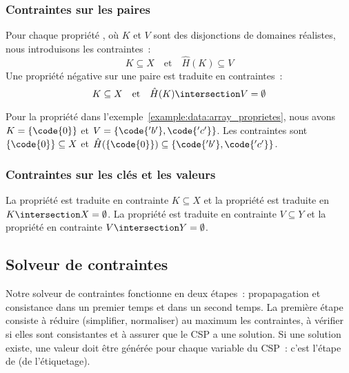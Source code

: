 \subsubsection{Contraintes sur les paires}

Pour chaque propriété , où $K$ et $V$ sont des disjonctions de
domaines réalistes, nous introduisons les contraintes~:
%
$$K \subseteq X \quad\mathrm{et}\quad \hat{H}(K) \subseteq V$$
%
Une propriété négative sur une paire  est traduite en
contraintes~:
%
$$K \subseteq X \quad\mathrm{et}\quad \hat{H}(K) \intersection V = \emptyset$$

Pour la propriété  dans
l'exemple~\ref{example:data:array_proprietes}, nous avons $K = \{\code{0}\}$ et
$V = \{\code{'b'}, \code{'c'}\}$. Les contraintes sont $\{\code{0}\} \subseteq
X$ et $\hat{H}(\{\code{0}\}) \subseteq \{\code{'b'}, \code{'c'}\}$.

\subsubsection{Contraintes sur les clés et les valeurs}

La propriété  est traduite en contrainte $K \subseteq X$ et la
propriété  est traduite en $K \intersection X = \emptyset$. La
propriété  est traduite en contrainte $V \subseteq Y$ et la
propriété  en contrainte $V \intersection Y = \emptyset$.

\subsection{Solveur de contraintes}
\label{subsection:data:solver}

Notre solveur de contraintes fonctionne en deux étapes~: propapagation et
consistance dans un premier temps et  dans un second temps.
La première étape consiste à réduire (simplifier, normaliser) au maximum les
contraintes, à vérifier si elles sont consistantes et à assurer que le CSP
a une solution. Si une solution existe, une valeur doit être générée pour chaque
variable du CSP~: c'est l'étape de  (de l'étiquetage).

